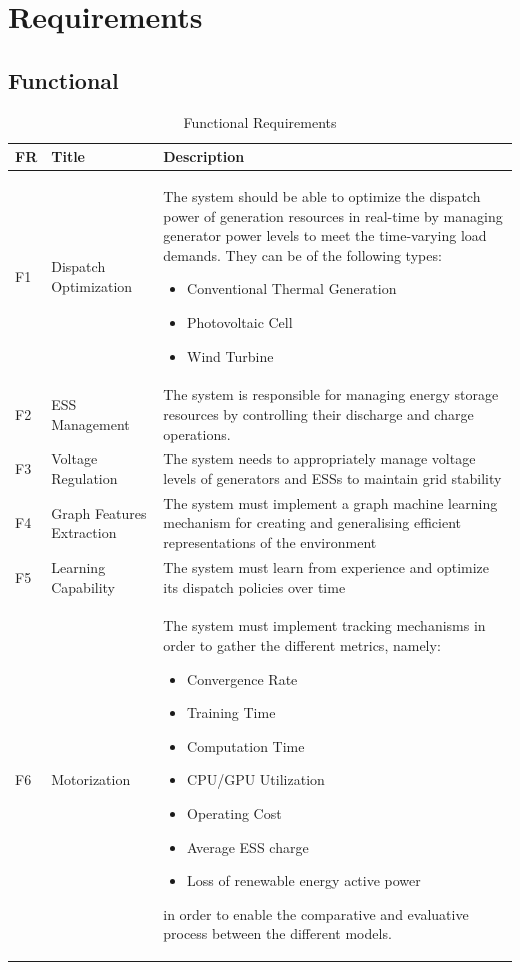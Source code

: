 \section{Requirements}  \label{sec:requirements}

\subsection{Functional}

\begin{table}[H]
	\centering
	\caption{Functional Requirements}
	\begin{tabular}{|P{1cm}|p{4cm}|p{8cm}|  }
		\hline
		\textbf{FR} & \textbf{Title} & \textbf{Description} \\
		\hline
		F1 & Dispatch Optimization & The system should be able to optimize the dispatch power of generation resources in real-time by managing generator power levels to meet the time-varying load demands. They can be of the following types:
		\begin{itemize}
			\item Conventional Thermal Generation
			\item Photovoltaic Cell
			\item Wind Turbine
		\end{itemize} \\
		\hline
		F2 & \ac{ESS} Management & The system is responsible for managing energy storage resources by controlling their discharge and charge operations. \\
		\hline
		F3 & Voltage Regulation & The system needs to appropriately manage voltage levels of generators and \acp{ESS} to maintain grid stability \\
		\hline
		F4 & Graph Features Extraction & The system must implement a graph machine learning mechanism for creating and generalising efficient representations of the environment \\
		\hline
		F5 & Learning Capability & The system must learn from experience and optimize its dispatch policies over time \\
		\hline
		F6 & Motorization & The system must implement tracking mechanisms in order to gather the different metrics, namely: 
		\begin{itemize}
			\item Convergence Rate
			\item Training Time
			\item Computation Time
			\item CPU/GPU Utilization
			\item Operating Cost
			\item Average \ac{ESS} charge
			\item Loss of renewable energy active power
		\end{itemize} 
		in order to enable the comparative and evaluative process between the different models. \\
		\hline
	\end{tabular}
\end{table}

